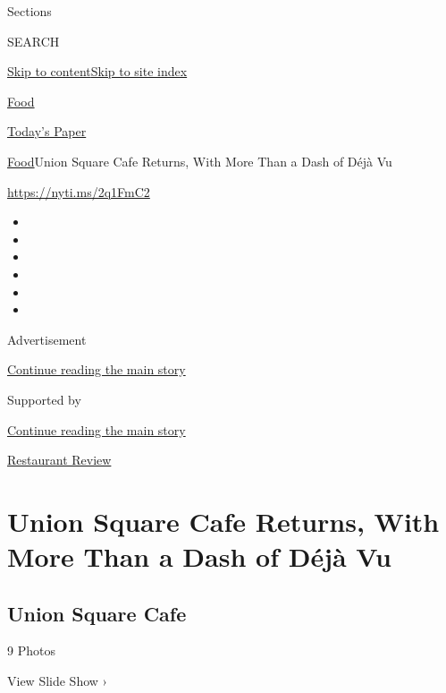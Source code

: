 Sections

SEARCH

\protect\hyperlink{site-content}{Skip to
content}\protect\hyperlink{site-index}{Skip to site index}

\href{https://www.nytimes3xbfgragh.onion/section/food}{Food}

\href{https://myaccount.nytimes3xbfgragh.onion/auth/login?response_type=cookie\&client_id=vi}{}

\href{https://www.nytimes3xbfgragh.onion/section/todayspaper}{Today's
Paper}

\href{/section/food}{Food}\textbar{}Union Square Cafe Returns, With More
Than a Dash of Déjà Vu

\url{https://nyti.ms/2q1FmC2}

\begin{itemize}
\item
\item
\item
\item
\item
\item
\end{itemize}

Advertisement

\protect\hyperlink{after-top}{Continue reading the main story}

Supported by

\protect\hyperlink{after-sponsor}{Continue reading the main story}

\href{/column/restaurant-review}{Restaurant Review}

\hypertarget{union-square-cafe-returns-with-more-than-a-dash-of-duxe9juxe0-vu}{%
\section{Union Square Cafe Returns, With More Than a Dash of Déjà
Vu}\label{union-square-cafe-returns-with-more-than-a-dash-of-duxe9juxe0-vu}}

\href{https://www.nytimes3xbfgragh.onion/slideshow/2017/04/25/dining/union-square-cafe.html}{}

\hypertarget{union-square-cafe}{%
\subsection{Union Square Cafe}\label{union-square-cafe}}

9 Photos

View Slide Show ›

